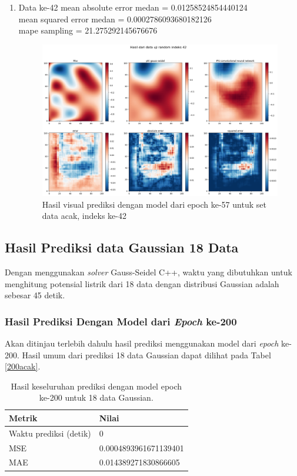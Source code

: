 \begin{enumerate}
    \item Data ke-42
    mean absolute error medan =  0.01258524854440124\\
    mean squared error medan =  0.0002786093680182126\\
    mape sampling =  21.275292145676676
    \begin{figure}[h!]
    \centering
    \includegraphics[width=12cm]{gambar/42_57_acak.png}
    \caption{Hasil visual prediksi dengan model dari epoch ke-57 untuk set data acak, indeks ke-42}
    \label{42_57_acak}
    \end{figure}
    
\end{enumerate}

\subsection{Hasil Prediksi data Gaussian 18 Data}
Dengan menggunakan \textit{solver} Gauss-Seidel C++, waktu yang dibutuhkan untuk menghitung potensial listrik dari 18 data dengan distribusi Gaussian adalah sebesar 45 detik.

\subsubsection{Hasil Prediksi Dengan Model dari \textit{Epoch} ke-200}
Akan ditinjau terlebih dahulu hasil prediksi menggunakan model dari \textit{epoch} ke-200. Hasil umum dari prediksi 18 data Gaussian dapat dilihat pada Tabel \ref{200acak}.

\begin{table}[h!]
\centering
\caption{Hasil keseluruhan prediksi dengan model epoch ke-200 untuk 18 data Gaussian.}
\label{200gaussian}
\begin{tabular}{ll}
\hline
\textbf{Metrik}        & \textbf{Nilai}         \\ \hline
Waktu prediksi (detik) & 0                      \\ \hline
MSE                    & 0.0004893961671139401 \\ \hline
MAE                    & 0.014389271830866605  \\ \hline
\end{tabular}
\end{table}

